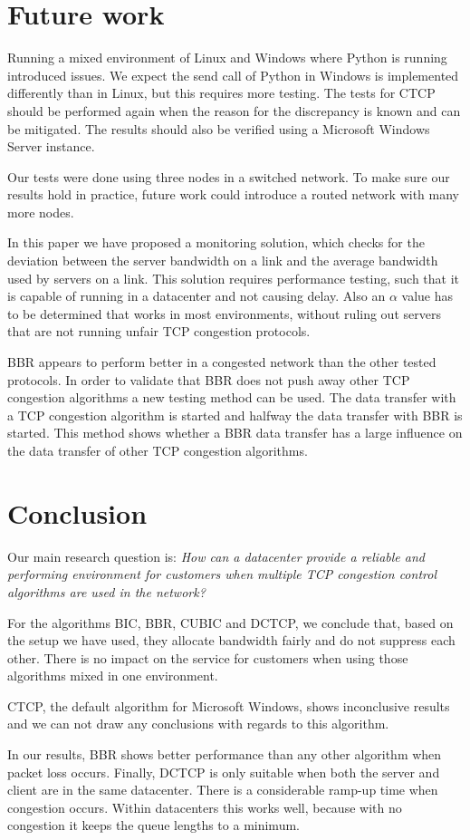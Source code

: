 \documentclass{article}
\begin{document}
\section{Future work}\label{sec:futurework}

Running a mixed environment of Linux and Windows where Python is running
introduced issues. We expect the send call of Python in Windows is implemented
differently than in Linux, but this requires more testing. The tests for CTCP
should be performed again when the reason for the discrepancy is known and can
be mitigated. The results should also be verified using a Microsoft Windows
Server instance.

Our tests were done using three nodes in a switched network. To make sure our
results hold in practice, future work could introduce a routed network with
many more nodes.

In this paper we have proposed a monitoring solution, which checks for the deviation between the server bandwidth on a link and the average bandwidth used by servers on a link. This solution requires performance testing, such that it is capable of running in a datacenter and not causing delay. Also an $\alpha$ value has to be determined that works in most environments, without ruling out servers that are not running unfair TCP congestion protocols.

BBR appears to perform better in a congested network than the other tested protocols. In order to validate that BBR does not push away other TCP congestion algorithms a new testing method can be used. The data transfer with a TCP congestion algorithm is started and halfway the data transfer with BBR is started. This method shows whether a BBR data transfer has a large influence on the data transfer of other TCP congestion algorithms.

\section{Conclusion}\label{sec:conclusion}

Our main research question is: {\it How can a datacenter provide a reliable and performing environment for customers when multiple TCP congestion control algorithms are used in the network?} 

For the algorithms BIC, BBR, CUBIC and DCTCP, we conclude that, based on the setup we have used, they allocate
bandwidth fairly and do not suppress each other. There is no impact on the
service for customers when using those algorithms mixed in one environment.

CTCP, the default algorithm for Microsoft Windows, shows inconclusive results
and we can not draw any conclusions with regards to this algorithm.

In our results, BBR shows better performance than any other algorithm when
packet loss occurs. Finally, DCTCP is only suitable when both the server and
client are in the same datacenter. There is a considerable ramp-up time when
congestion occurs. Within datacenters this works well, because with no
congestion it keeps the queue lengths to a minimum.

\printbibliography
\end{document}
